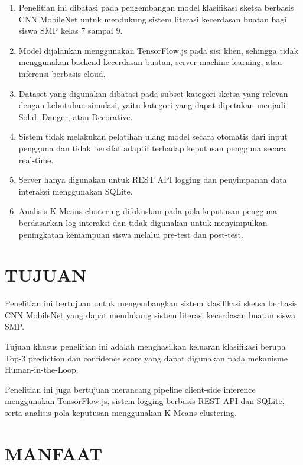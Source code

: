 \documentclass[12pt,oneside]{report}
\begin{document}
\begin{enumerate}
\item Penelitian ini dibatasi pada pengembangan model klasifikasi sketsa berbasis CNN MobileNet untuk mendukung sistem literasi kecerdasan buatan bagi siswa SMP kelas 7 sampai 9.
\item Model dijalankan menggunakan TensorFlow.js pada sisi klien, sehingga tidak menggunakan backend kecerdasan buatan, server machine learning, atau inferensi berbasis cloud.
\item Dataset yang digunakan dibatasi pada subset kategori sketsa yang relevan dengan kebutuhan simulasi, yaitu kategori yang dapat dipetakan menjadi Solid, Danger, atau Decorative.
\item Sistem tidak melakukan pelatihan ulang model secara otomatis dari input pengguna dan tidak bersifat adaptif terhadap keputusan pengguna secara real-time.
\item Server hanya digunakan untuk REST API logging dan penyimpanan data interaksi menggunakan SQLite.
\item Analisis K-Means clustering difokuskan pada pola keputusan pengguna berdasarkan log interaksi dan tidak digunakan untuk menyimpulkan peningkatan kemampuan siswa melalui pre-test dan post-test.
\end{enumerate}

\section{TUJUAN}
\label{sec:tujuan}

Penelitian ini bertujuan untuk mengembangkan sistem klasifikasi sketsa berbasis CNN MobileNet yang dapat mendukung sistem literasi kecerdasan buatan siswa SMP.

Tujuan khusus penelitian ini adalah menghasilkan keluaran klasifikasi berupa Top-3 prediction dan confidence score yang dapat digunakan pada mekanisme Human-in-the-Loop.

Penelitian ini juga bertujuan merancang pipeline client-side inference menggunakan TensorFlow.js, sistem logging berbasis REST API dan SQLite, serta analisis pola keputusan menggunakan K-Means clustering.

\section{MANFAAT}
\label{sec:manfaat}
\end{document}
